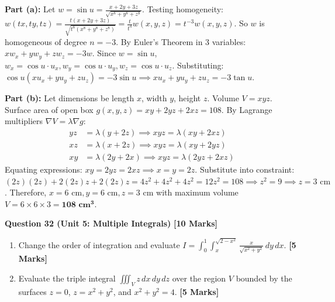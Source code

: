 \begin{solbox}
\textbf{Part (a):}
Let $w = \sin u = \frac{x+2y+3z}{\sqrt{x^8+y^8+z^8}}$.
Testing homogeneity: $w(tx, ty, tz) = \frac{t(x+2y+3z)}{\sqrt{t^8(x^8+y^8+z^8)}} = \frac{t}{t^4} w(x,y,z) = t^{-3} w(x,y,z)$.
So $w$ is homogeneous of degree $n = -3$.
By Euler's Theorem in 3 variables: $x w_x + y w_y + z w_z = -3 w$.
Since $w = \sin u$, $w_x = \cos u \cdot u_x, w_y = \cos u \cdot u_y, w_z = \cos u \cdot u_z$.
Substituting: $\cos u (x u_x + y u_y + z u_z) = -3\sin u \implies x u_x + y u_y + z u_z = -3\tan u$.

\textbf{Part (b):}
Let dimensions be length $x$, width $y$, height $z$.
Volume $V = xyz$. Surface area of open box $g(x,y,z) = xy + 2yz + 2xz = 108$.
By Lagrange multipliers $\nabla V = \lambda \nabla g$:
\begin{align}
yz &= \lambda(y + 2z) \implies xyz = \lambda(xy + 2xz) \\
xz &= \lambda(x + 2z) \implies xyz = \lambda(xy + 2yz) \\
xy &= \lambda(2y + 2x) \implies xyz = \lambda(2yz + 2xz)
\end{align}
Equating expressions: $xy = 2yz = 2xz \implies x = y = 2z$.
Substitute into constraint: $(2z)(2z) + 2(2z)z + 2(2z)z = 4z^2 + 4z^2 + 4z^2 = 12z^2 = 108 \implies z^2 = 9 \implies z = 3\text{ cm}$.
Therefore, $x = 6\text{ cm}, y = 6\text{ cm}, z = 3\text{ cm}$ with maximum volume $V = 6 \times 6 \times 3 = \mathbf{108\text{ cm}^3}$.
\end{solbox}

\vspace{4mm}
\noindent\textbf{Question 32 (Unit 5: Multiple Integrals)} \hfill \textbf{[10 Marks]}
\begin{enumerate}[label=(\alph*),topsep=2pt,itemsep=2pt]
    \item Change the order of integration and evaluate $I = \int_0^1 \int_x^{\sqrt{2-x^2}} \frac{x}{\sqrt{x^2+y^2}}\,dy\,dx$. \hfill \textbf{[5 Marks]}
    \item Evaluate the triple integral $\iiint_V z\,dx\,dy\,dz$ over the region $V$ bounded by the surfaces $z = 0$, $z = x^2+y^2$, and $x^2+y^2 = 4$. \hfill \textbf{[5 Marks]}
\end{enumerate}

